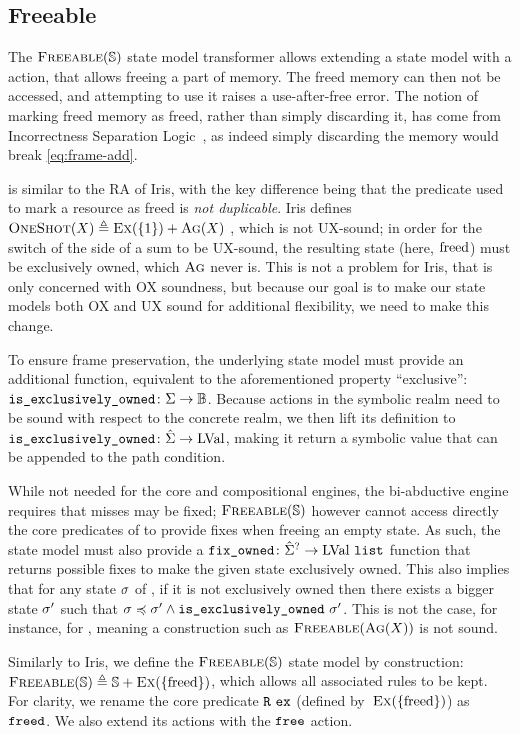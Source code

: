\subsection{Freeable}

The $\textsc{Freeable}(\mathbb S)$ state model transformer allows extending a state model with a \free{} action, that allows freeing a part of memory. The freed memory can then not be accessed, and attempting to use it raises a use-after-free error. The notion of marking freed memory as freed, rather than simply discarding it, has come from Incorrectness Separation Logic~\cite{isl}, as indeed simply discarding the memory would break \ref{eq:frame-add}.

\Freeable{} is similar to the  RA of Iris, with the key difference being that the \freedP{} predicate used to mark a resource as freed is \emph{not duplicable}. Iris defines $\textsc{OneShot}(X) \triangleq \textsc{Ex}(\{1\}) + \textsc{Ag}(X)$ \cite{iris}, which is not UX-sound; in order for the switch of the side of a sum to be UX-sound, the resulting state (here, $\text{freed}$) must be exclusively owned, which $\textsc{Ag}$ never is. This is not a problem for Iris, that is only concerned with OX soundness, but because our goal is to make our state models both OX and UX sound for additional flexibility, we need to make this change.

To ensure frame preservation, the underlying state model must provide an additional function, equivalent to the aforementioned property ``exclusive'': ${\texttt{is\_exclusively\_owned}\colon\Sigma\rightarrow\mathbb{B}}$. Because actions in the symbolic realm need to be sound with respect to the concrete realm, we then lift its definition to ${\texttt{is\_exclusively\_owned}\colon\hat{\Sigma}\rightarrow\text{LVal}}$, making it return a symbolic value that can be appended to the path condition.

While not needed for the core and compositional engines, the bi-abductive engine requires that  misses may be fixed; $\textsc{Freeable}(\mathbb S)$ however cannot access directly the core predicates of \mmdl{} to provide fixes when freeing an empty state. As such, the state model must also provide a ${\texttt{fix\_owned}\colon\hat{\Sigma}^?\rightarrow\text{LVal}~\texttt{list}}$ function that returns possible fixes to make the given state exclusively owned. This also implies that for any state $\sigma$ of \mmdl{}, if it is not exclusively owned then there exists a bigger state $\sigma'$ such that ${\sigma\preccurlyeq\sigma' \land \texttt{is\_exclusively\_owned}~\sigma'}$. This is not the case, for instance, for \Ag, meaning a construction such as $\textsc{Freeable}(\textsc{Ag}(X))$ is not sound.

Similarly to Iris, we define the $\textsc{Freeable}(\mathbb S)$ state model by construction: $\textsc{Freeable}(\mathbb S) \triangleq \mathbb S + \textsc{Ex}(\{\text{freed}\})$, which allows all associated rules to be kept. For clarity, we rename the core predicate $\texttt{R}~\texttt{ex}$ (defined by~$\textsc{Ex}(\{\text{freed}\})$) as $\texttt{freed}$. We also extend its actions with the $\texttt{free}$ action.


